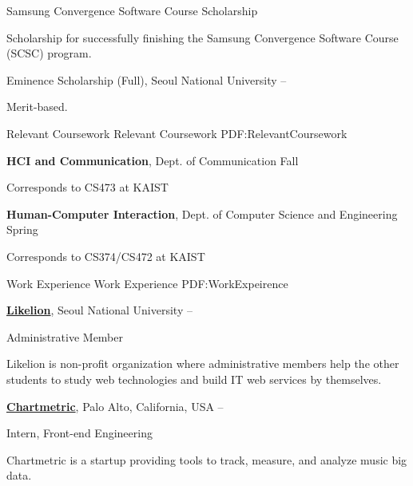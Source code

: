 \documentclass[letterpaper,MMMyyyy,nonstopmode]{simpleresumecv}
\begin{document}
\begin{Body}
\Gap
\BulletItem
Samsung Convergence Software Course Scholarship
\hfill
{}
\begin{Detail}
\Item
Scholarship for successfully finishing the Samsung Convergence Software Course (SCSC) program.
\end{Detail}

\Gap
\BulletItem
Eminence Scholarship (Full),
Seoul National University
\hfill
{} --
\begin{Detail}
\Item
Merit-based.
\end{Detail}


\BigGap
\Section
{Relevant Coursework}
{Relevant Coursework}
{PDF:RelevantCoursework}

\Entry
\textbf{HCI and Communication},
Dept. of Communication
\hfill
{} Fall

\Gap
\BulletItem
Corresponds to CS473 at KAIST

\BigGap
\Entry
\textbf{Human-Computer Interaction},
Dept. of Computer Science and Engineering
\hfill
{} Spring

\Gap
\BulletItem
Corresponds to CS374/CS472 at KAIST


\BigGap
\Section
{Work Experience}
{Work Experience}
{PDF:WorkExpeirence}

\Entry
\href{https://likelion.net}
{\textbf{Likelion}},
Seoul National University
\hfill
{} --

\Gap
\BulletItem
Administrative Member
\begin{Detail}
\SubBulletItem
Likelion is non-profit organization where administrative members help the other students to study web technologies and build IT web services by themselves.
\end{Detail}

\BigGap
\Entry
\href{https://chartmetric.io}
{\textbf{Chartmetric}},
Palo Alto, California, USA
\hfill
{} --

\Gap
\BulletItem
Intern, Front-end Engineering
\begin{Detail}
\SubBulletItem
Chartmetric is a startup providing tools to track, measure, and analyze music big data.
\end{Detail}




\end{Body}
\end{document}
